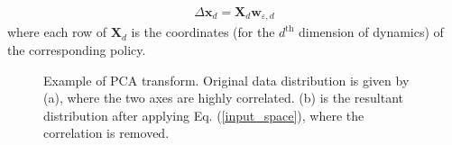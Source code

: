 \documentclass[journal]{IEEEtran}
\begin{document}
\begin{equation}
\begin{gathered}
\Delta \bm{x}_{d} = 
\bm{X}_{d}
\bm{w}_{\varepsilon, d}
\end{gathered}
\label{prior_mean_function}
\end{equation}
where each row of $\bm{X}_{d}$ is the coordinates (for the $d^{\text{th}}$ dimension of dynamics) of the corresponding policy.
%
\begin{figure}[h]
\centering
{}
{}
\caption{Example of PCA transform. Original data distribution is given by (a), where the two axes are highly correlated. (b) is the resultant distribution after applying Eq. (\ref{input_space}), where the correlation is removed.}
\label{PCA_outcome}
\end{figure}
\end{document}
